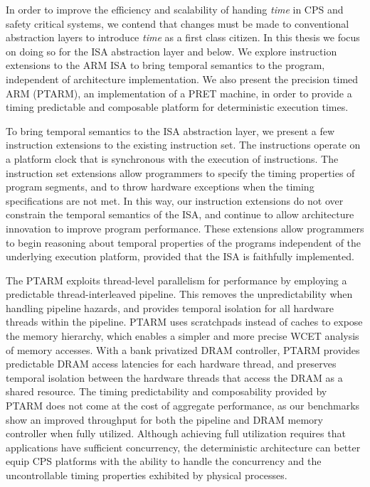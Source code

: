 In order to improve the efficiency and scalability of handing \emph{time} in CPS and safety critical systems, we contend that changes must be made to conventional abstraction layers to introduce \emph{time} as a first class citizen.
In this thesis we focus on doing so for the ISA abstraction layer and below.  
We explore instruction extensions to the ARM ISA to bring temporal semantics to the program, independent of architecture implementation.  
We also present the precision timed ARM (PTARM), an implementation of a PRET machine, in order to provide a timing predictable and composable platform for deterministic execution times.  

To bring temporal semantics to the ISA abstraction layer, we present a few instruction extensions to the existing instruction set. 
The instructions operate on a platform clock that is synchronous with the execution of instructions. 
The instruction set extensions allow programmers to specify the timing properties of program segments, and to throw hardware exceptions when the timing specifications are not met.
In this way, our instruction extensions do not over constrain the temporal semantics of the ISA, and continue to allow architecture innovation to improve program performance. 
These extensions allow programmers to begin reasoning about temporal properties of the programs independent of the underlying execution platform, provided that the ISA is faithfully implemented.

The PTARM exploits thread-level parallelism for performance by employing a predictable thread-interleaved pipeline. 
This removes the unpredictability when handling pipeline hazards, and provides temporal isolation for all hardware threads within the pipeline.
PTARM uses scratchpads instead of caches to expose the memory hierarchy, which enables a simpler and more precise WCET analysis of memory accesses.  
With a bank privatized DRAM controller, PTARM provides predictable DRAM access latencies for each hardware thread, and preserves temporal isolation between the hardware threads that access the DRAM as a shared resource.
The timing predictability and composability provided by PTARM does not come at the cost of aggregate performance, as our benchmarks show an improved throughput for both the pipeline and DRAM memory controller when fully utilized.  
Although achieving full utilization requires that applications have sufficient concurrency, the deterministic architecture can better equip CPS platforms with the ability to handle the concurrency and the uncontrollable timing properties exhibited by physical processes.

